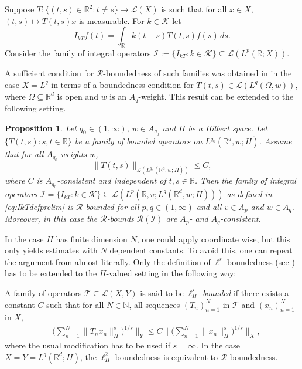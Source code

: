 \documentclass{amsart}
\theoremstyle{plain}
\theoremstyle{remark}
\theoremstyle{plain}
\newtheorem{proposition}[theorem]{Proposition}
\numberwithin{equation}{section}
\begin{document}
Suppose $T:\{(t,s)\in { \mathbb{R} }^2: t\neq s\}\to {{\mathscr L}}(X)$ is such that for all $x\in X$, $(t,s)\mapsto T(t,s)x$ is measurable. For $k\in {\mathcal{K}}$ let
\begin{equation}\label{eq:IkTdefprelim}
I_{k T} f(t) = \int_{ \mathbb{R} } k(t-s) T(t,s) f(s)\, ds.
\end{equation}
Consider the family of integral operators ${ \mathscr{I} }:=\{I_{k T}: k\in {\mathcal{K}}\}\subseteq{{\mathscr L}}(L^{p}({ \mathbb{R} };X))$.

A sufficient condition for ${\ensuremath{\mathcal{R}}}$-boundedness of such families was obtained in \cite[Theorem 1.1]{GLV} in the case $X = L^q$ in terms of a boundedness condition for $T(t,s)\in {{\mathscr L}}(L^q(\Omega,w))$, where $\Omega\subseteq { \mathbb{R} }^d$ is open and $w$ is an $A_q$-weight. This result can be extended to the following setting.
\begin{proposition}\label{prop:weightedRextended}
Let $q_0\in (1, \infty)$, $w\in A_{q_0}$ and $H$ be a Hilbert space. Let $\{T(t,s):s,t\in { \mathbb{R} }\}$ be a family of bounded operators on $L^{q_0}({ \mathbb{R} }^{d},w;H)$. Assume that for all $A_{q_0}$-weights $w$,
\begin{equation}\label{eq:weightedcond}
\|T(t,s)\|_{{{\mathscr L}}(L^{q_0}({ \mathbb{R} }^{d},w;H))}\leq C,
\end{equation}
where $C$ is $A_{q_0}$-consistent and independent of $t,s\in { \mathbb{R} }$. Then the family of integral operators
${ \mathscr{I} } = \{I_{k T}: k\in {\mathcal{K}}\}\subseteq {{\mathscr L}}(L^p({ \mathbb{R} },v;L^q({ \mathbb{R} }^{d},w;H)))$ as defined in \eqref{eq:IkTdefprelim} is ${\ensuremath{\mathcal{R}}}$-bounded for all $p,q\in (1, \infty)$ and all $v\in A_p$ and $w\in A_q$. Moreover, in this case the ${\ensuremath{\mathcal{R}}}$-bounds ${\ensuremath{\mathcal{R}}}({ \mathscr{I} })$ are $A_{p}$- and $A_q$-consistent.
\end{proposition}

In the case $H$ has finite dimension $N$, one could apply \cite[Theorem 1.1]{GLV} coordinate wise, but this only yields estimates with $N$ dependent constants. To avoid this, one can repeat the argument from \cite[Theorem 1.1]{GLV} almost literally. Only the definition of $\ell^s$-boundedness (see \cite{KunstUll}) has to be extended to the $H$-valued setting in the following way:

A family of operators ${ \mathscr{T} } \subseteq {{\mathscr L}}(X,Y)$ is said to be {\em $\ell^s_H$-bounded} if there exists a constant $C$ such that for all $N\in { \mathbb{N} }$, all sequences $(T_n)_{n=1}^N$ in ${ \mathscr{T} }$ and $(x_n)_{n=1}^N$ in $X$,
\begin{align}\label{eq:defRbddsquarefun}
\Big\|\Big(\sum_{n=1}^N \|T_n x_n\|_{H}^{s}\Big)^{1/s}\Big\|_{Y} \leq C\Big\|\Big(\sum_{n=1}^N \|x_n\|_{H}^{s}\Big)^{1/s}\Big\|_{X},
\end{align}
where the usual modification has to be used if $s=\infty$. In the case $X=Y=L^{q}({ \mathbb{R} }^d;H)$, the $\ell^2_H$-boundedness is equivalent to ${\ensuremath{\mathcal{R}}}$-boundedness.
\end{document}
